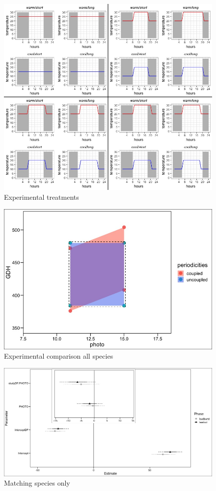 \documentclass[12pt]{article}\usepackage[]{graphicx}\usepackage[]{color}
\begin{document}
\begin{figure}[h!]
    \centering
 \includegraphics[width=\textwidth]{..//Plots/periodicity_figures/new_treats.jpeg}
    \caption{Experimental treatments}
    \label{fig:Figure 1}
\end{figure}

\begin{figure}[h!]
    \centering
 \includegraphics[width=\textwidth]{..//Plots/periodicity_figures/Uncoupled_coupled.jpeg}
    \caption{Experimental comparison all species}
    \label{fig:Figure 2}
\end{figure}

\begin{figure}[h!]
    \centering
 \includegraphics[width=\textwidth]{..//Plots/periodicity_figures/photothermo_matchsps.jpeg}
    \caption{Matching species only}
    \label{fig:Figure 3}
\end{figure}
\end{document}
